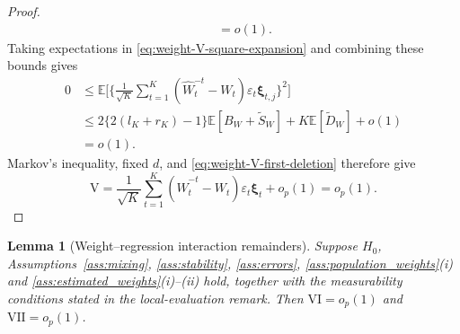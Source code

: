 \documentclass[12pt]{article}
\def\E{\mathbb{E}}
\newtheorem{lemma}[theorem]{Lemma}
\numberwithin{equation}{section}
\begin{document}
\begin{proof}
\begin{align}
&\quad=o(1).
\label{eq:weight-V-double-deletion-probability}
\end{align}
Taking expectations in \eqref{eq:weight-V-square-expansion}
and combining these bounds gives
\begin{align*}
0
&\leq
\E\Big[
\Big\{\frac1{\sqrt K}\sum_{t=1}^K
(\hat W_t^{-t}-W_t)
\varepsilon_t\boldsymbol\xi_{t,j}\Big\}^{2}
\Big]\\
&\leq
2\{2(l_K+r_K)-1\}\E[B_W+\tilde S_W]
+K\E[\tilde D_W]+o(1)\\
&=o(1).
\end{align*}
Markov's inequality, fixed \(d\), and
\eqref{eq:weight-V-first-deletion} therefore give
\begin{equation}
\label{eq:weight-V-convergence}
\mathrm V
=\frac1{\sqrt K}\sum_{t=1}^K
(\hat W_t^{-t}-W_t)\varepsilon_t\boldsymbol\xi_t+o_p(1)
=o_p(1).
\end{equation}
\end{proof}


\begin{lemma}[Weight--regression interaction remainders]
\label{lem:weight-regression-remainders}
Suppose \(H_0\), Assumptions~\ref{ass:mixing}, \ref{ass:stability},
\ref{ass:errors}, \ref{ass:population_weights}(i) and
\ref{ass:estimated_weights}(i)--(ii) hold, together with the
measurability conditions stated in the local-evaluation remark.
Then \(\mathrm{VI}=o_p(1)\) and \(\mathrm{VII}=o_p(1)\).
\end{lemma}
\end{document}

